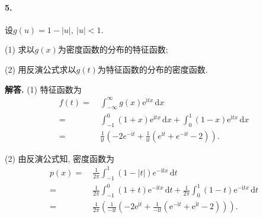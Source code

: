 \documentclass[12pt, a4paper, oneside]{ctexart}
\newenvironment{solution}{\par\noindent\textbf{解答. }}{\bigskip\par}
\def\d{\mathrm{d}}      %
\def\e{\mathrm{e}}      %
\def\i{\mathrm{i}}      %
\begin{document}
\paragraph{5.}设$g(u) = 1-|u|,\ |u| < 1$.

(1) 求以$g(x)$为密度函数的分布的特征函数;

(2) 用反演公式求以$g(t)$为特征函数的分布的密度函数.
\begin{solution}
    (1) 特征函数为
    \begin{align*}
        f(t) =&\ \int_{-\infty}^\infty g(x)\e^{\i tx}\,\d x\\
        =&\ \int_{-1}^0(1+x)\e^{\i tx}\,\d x +\int_0^1(1-x)\e^{\i tx}\,\d x\\
        =&\ \frac{1}{\i t}(-2e^{-\i t}+\frac{1}{\i t}(e^{\i t}+e^{-\i t}-2)).
    \end{align*}

    (2) 由反演公式知, 密度函数为
    \begin{align*}
        p(x) =&\ \frac{1}{2\pi}\int_{-1}^{1}(1-|t|)e^{-\i tx}\,\d t\\
        =&\ \frac{1}{2\pi}\int_{-1}^0(1+t)\e^{-\i tx}\,\d t+\frac{1}{2\pi}\int_0^1(1-t)\e^{-\i tx}\,\d t\\
        =&\ \frac{1}{2\pi}\left(\frac{1}{-\i t}\left(-2\e^{\i t}+\frac{1}{-\i t}\left(\e^{-\i t}+\e^{\i t}-2\right)\right)\right).
    \end{align*}
\end{solution}

\iffalse
\centerline{
    \texttt{[image: figure.png]}
}
\renewcommand\arraystretch{0.8} %
\begin{table}[!htbp] %
    \centering %
    \begin{tabular}{p{1cm}<{\centering}p{1cm}<{\centering}p{3cm}<{\centering}p{5cm}<{\centering}} %
        \toprule
        $x_i$ & $f[x_1]$ & $f[x_i,x_{i+1}]$ & $f[x_i,x_{i+1},x_{i+2}]$ \\
        \midrule
        $x_0$ & $f(x_0)$ &                  &                          \\
        $x_0$ & $f(x_0)$ & $f'(x_0)$        &                          \\
        $x_0$ & $f(x_1)$ & $\frac{f(x_1)-f(x_0)}{x_1-x_0}$ & $\frac{f(x_1)-f(x_0)}{(x_1-x_0)^2}-\frac{f'(x_0)}{x_1-x_0}$\\
        \bottomrule
    \end{tabular}
\end{table}

\def\Log{\text{Log}} %
$\Log$ %
\fi
\end{document}
